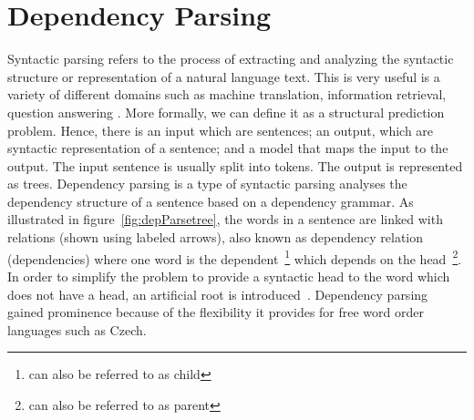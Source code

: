 \section{Dependency Parsing}

Syntactic parsing refers to the process of extracting and analyzing the syntactic structure or representation of a natural language text. This is very useful is a variety of different domains such as machine translation, information retrieval, question answering \cite{hall2008transition}. More formally, we can define it as a structural prediction problem. Hence, there is an input which are sentences; an output, which are syntactic representation of a sentence;  and a model that maps the input to the output. The input sentence is usually split into tokens. The output is represented as trees. Dependency parsing is a type of syntactic parsing analyses the dependency structure of a sentence based on a dependency grammar. As illustrated in figure~\ref{fig:depParsetree}, the words in a sentence are linked with relations (shown using labeled arrows), also known as dependency relation (dependencies) where one word is the dependent~\footnote{can also be referred to as child} which depends on the head~\footnote{can also be referred to as parent}. In order to simplify the problem to provide a syntactic head to the word which does not have a head, an artificial root is introduced~\cite{kubler2009dependency}. Dependency parsing gained prominence because of the flexibility it provides for free word order languages such as Czech.

